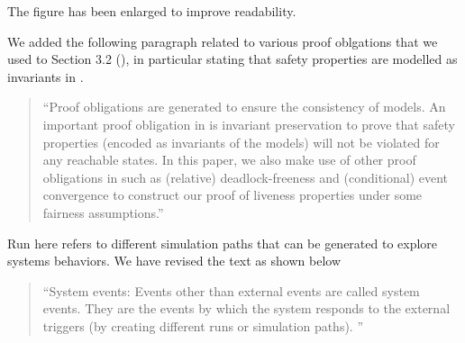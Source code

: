 \documentclass{response}
\begin{document}
\begin{comment}{Reviewer \#1}
• p.15 Fig. 5 is too small. One cannot read its text.
\end{comment}

\begin{response}
  The figure has been enlarged to improve readability.
\end{response}

\begin{comment}{Reviewer \#1}
• p.18 It would have been interesting to state the discussion of the first
paragraph of section 7: Verification of Safety Properties within the
context of the proof obligation generator you have at hand.
\end{comment}

\begin{response}
  We added the following paragraph related to various proof oblgations
  that we used to Section 3.2 (\EventB), in particular stating that
  safety properties are modelled as invariants in \EventB.
  \begin{quote}
    ``Proof obligations are generated to ensure the consistency of
  \mbox{\EventB} models.  An important proof obligation in
  \mbox{\EventB} is invariant preservation to prove that safety
  properties (encoded as invariants of the models) will not be violated
  for any reachable states. In this paper, we also make use of other
  proof obligations in \mbox{\EventB} such as (relative)
  deadlock-freeness and (conditional) event convergence to construct
  our proof of liveness properties under some fairness assumptions.''
  \end{quote}
\end{response}

\begin{comment}{Reviewer \#1}
• p.19 Could you precise your notion of run.
\end{comment}

\begin{response}
  Run here refers to different simulation paths that can be generated to explore systems behaviors.
  We have revised the text as shown below
  \begin{quote}
    ``System events: Events other than external events are called system events.
    They are the events by which the system responds to the external triggers (by creating 
    different runs or simulation paths). 
   ''
  \end{quote}
\end{response}
\end{document}
